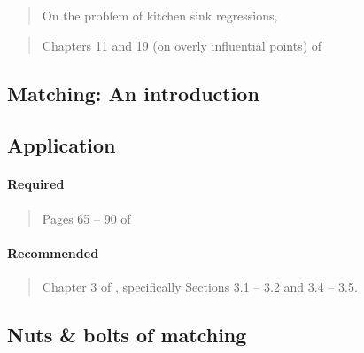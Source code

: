 \documentclass[12pt]{article}
\begin{document}
\begin{verse} On the problem of kitchen sink regressions,  \end{verse}

\begin{verse} Chapters 11 and 19 (on overly influential points) of  \end{verse}

\subsection{Matching: An introduction}

\subsection*{Application}

\begin{verse}  \end{verse}

\paragraph*{Required}

\begin{verse}
  Pages 65 -- 90 of 
\end{verse}

\begin{verse}
\end{verse}

\paragraph*{Recommended}

\begin{verse}
  Chapter 3 of , specifically Sections 3.1 -- 3.2 and 3.4 -- 3.5.
\end{verse}

\begin{verse}  \end{verse}



\subsection{Nuts \& bolts of matching}
\end{document}
